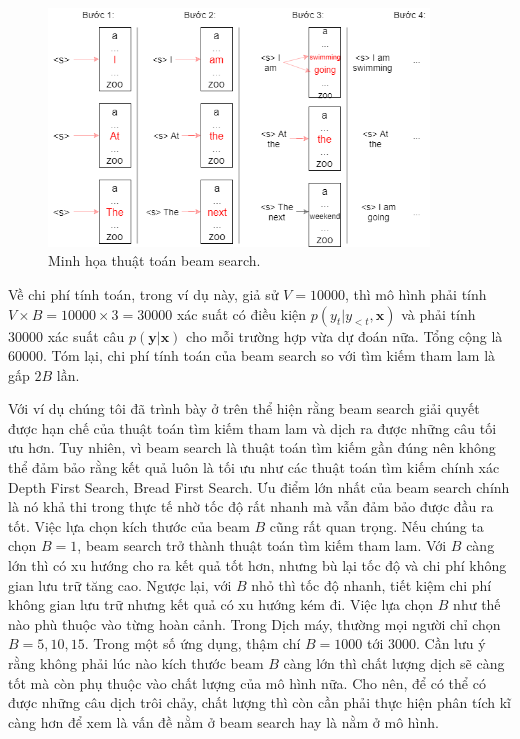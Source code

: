 \begin{figure}
	\centering
	\includegraphics[width=0.9\textwidth]{beam-search.png}
	\caption[Minh họa thuật toán beam search.]{Minh họa thuật toán beam search.}
	\label{fig_beam-search}
\end{figure}
Về chi phí tính toán, trong ví dụ này, giả sử $V = 10000$, thì mô hình phải tính  $V \times B = 10000 \times 3 = 30000$ xác suất có điều kiện $p(y_t | y_{<t}, \bm{x})$  và phải tính $30000$ xác suất câu $p(\bm{y} | \bm{x})$ cho mỗi trường hợp vừa dự đoán nữa. Tổng cộng là $60000$. Tóm lại, chi phí tính toán của beam search so với tìm kiếm tham lam là gấp $2B$ lần.

Với ví dụ chúng tôi đã trình bày ở trên thể hiện rằng beam search giải quyết được hạn chế của thuật toán tìm kiếm tham lam và dịch ra được những câu tối ưu hơn. Tuy nhiên, vì beam search là thuật toán tìm kiếm gần đúng nên không thể đảm bảo rằng kết quả luôn là tối ưu như các thuật toán tìm kiếm chính xác Depth First Search, Bread First Search. Ưu điểm lớn nhất của beam search chính là nó khả thi trong thực tế nhờ tốc độ rất nhanh mà vẫn đảm bảo được đầu ra tốt. Việc lựa chọn kích thước của beam $B$ cũng rất quan trọng. Nếu chúng ta chọn $B = 1$, beam search trở thành thuật toán tìm kiếm tham lam. Với $B$ càng lớn thì có xu hướng cho ra kết quả tốt hơn, nhưng bù lại tốc độ và chi phí không gian lưu trữ tăng cao. Ngược lại, với $B$ nhỏ thì tốc độ nhanh, tiết kiệm chi phí không gian lưu trữ nhưng kết quả có xu hướng kém đi. Việc lựa chọn $B$ như thế nào phù thuộc vào từng hoàn cảnh. Trong Dịch máy, thường mọi người chỉ chọn $B = 5, 10, 15$. Trong một số ứng dụng, thậm chí $B = 1000$ tới $3000$. Cần lưu ý rằng không phải lúc nào kích thước beam $B$ càng lớn thì chất lượng dịch sẽ càng tốt mà còn phụ thuộc vào chất lượng của mô hình nữa. Cho nên, để có thể có được những câu dịch trôi chảy, chất lượng thì còn cần phải thực hiện phân tích kĩ càng hơn để xem là vấn đề nằm ở beam search hay là nằm ở mô hình.


